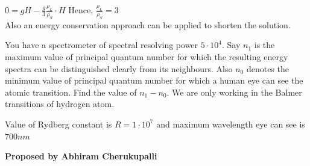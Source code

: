 \documentclass[11pt,a4paper]{scrartcl}
\begin{document}
\begin{solution}
\begin{center}
\begin{tikzpicture}[x=0.75pt,y=0.75pt,yscale=-1,xscale=1]
\end{tikzpicture}
\end{center}
$0 = gH - \frac{g}{3}\frac{\rho_L}{\rho_S} \cdot H$\newline
Hence,
$\boxed{ \frac{\rho_L}{\rho_S} = 3}$\\

Also an energy conservation approach can be applied to shorten the solution.
\end{solution}


\vspace{10mm}%

\begin{problem}

You have a spectrometer of spectral resolving power $5\cdot 10^4$. Say $n_1$ is the maximum value of principal quantum number for which the resulting energy spectra can be distinguished clearly from its neighbours. Also $n_0$ denotes the minimum value of principal quantum number for which a human eye can see the atomic transition. Find the value of $\boxed{n_1-n_{0}}$. We are only working in the Balmer transitions of hydrogen atom.

Value of Rydberg constant is $R=1\cdot 10^7$ and maximum wavelength eye can see is $700 nm$
\end{problem}
\begin{flushright}
\textbf{\Large{Proposed by Abhiram Cherukupalli}}
\end{flushright}
\end{document}
